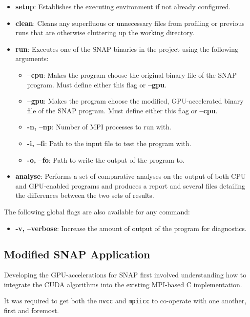 \documentclass[conference]{IEEEtran}
\begin{document}
\begin{itemize}
    \item \textbf{setup}: Establishes the executing environment if not already configured.
    \item \textbf{clean}: Cleans any superfluous or unnecessary files from profiling or previous runs that are otherwise cluttering up the working directory.
    \item \textbf{run}: Executes one of the SNAP binaries in the project using the following arguments:
    \begin{itemize}
        \item \textbf{--cpu}: Makes the program choose the original binary file of the SNAP program. Must define either this flag or \textbf{--gpu}.
        \item \textbf{--gpu}: Makes the program choose the modified, GPU-accelerated binary file of the SNAP program. Must define either this flag or \textbf{--cpu}.
        \item \textbf{-n, --np}: Number of MPI processes to run with.
        \item \textbf{-i, --fi}: Path to the input file to test the program with. 
        \item \textbf{-o, --fo}: Path to write the output of the program to.
    \end{itemize}
    \item \textbf{analyse}: Performs a set of comparative analyses on the output of both CPU and GPU-enabled programs and produces a report and several files detailing the differences between the two sets of results.
\end{itemize}

The following global flags are also available for any command:

\begin{itemize}
    \item \textbf{-v, --verbose}: Increase the amount of output of the program for diagnostics.
\end{itemize}


\subsection{Modified SNAP Application}
\label{subsec:imp_mod_snap}

Developing the GPU-accelerations for SNAP first involved understanding how to integrate the CUDA algorithms into the existing MPI-based C implementation.

It was required to get both the \texttt{nvcc} and \texttt{mpiicc} to co-operate with one another, first and foremost.
\end{document}
